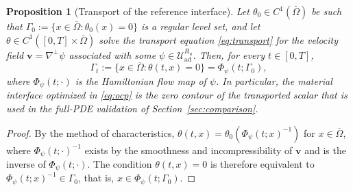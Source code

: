 \documentclass[12pt, reqno]{amsart}
\theoremstyle{plain}
\newtheorem{prop}[thm]{Proposition}
\theoremstyle{definition}
\numberwithin{equation}{section}
\numberwithin{figure}{section}
\numberwithin{algorithm}{section}
\begin{document}
\begin{prop}[Transport of the reference interface]\label{prop:zero_contour}
Let $\theta_0\in C^1(\overline\Omega)$ be such that $\Gamma_0:=\{x\in\overline\Omega:\theta_0(x)=0\}$ is a regular level set, and let $\theta\in C^1([0,T]\times\overline\Omega)$ solve the transport equation \eqref{eq:transport} for the velocity field $\mathbf v=\nabla^\perp\psi$ associated with some $\psi\in\mathcal U_{\mathrm{ad}}^{R_u}$. Then, for every $t\in[0,T]$,
\begin{equation*}
\Gamma_t:=\{x\in\overline\Omega:\theta(t,x)=0\}=\Phi_\psi(t;\Gamma_0),
\end{equation*}
where $\Phi_\psi(t;\cdot)$ is the Hamiltonian flow map of $\psi$. In particular, the material interface optimized in \eqref{eq:ocp} is the zero contour of the transported scalar that is used in the full-PDE validation of Section~\ref{sec:comparison}.
\end{prop}

\begin{proof}
By the method of characteristics, $\theta(t,x)=\theta_0(\Phi_\psi(t;x)^{-1})$ for $x\in\overline\Omega$, where $\Phi_\psi(t;\cdot)^{-1}$ exists by the smoothness and incompressibility of $\mathbf v$ and is the inverse of $\Phi_\psi(t;\cdot)$. The condition $\theta(t,x)=0$ is therefore equivalent to $\Phi_\psi(t;x)^{-1}\in\Gamma_0$, that is, $x\in\Phi_\psi(t;\Gamma_0)$.
\end{proof}
\end{document}
